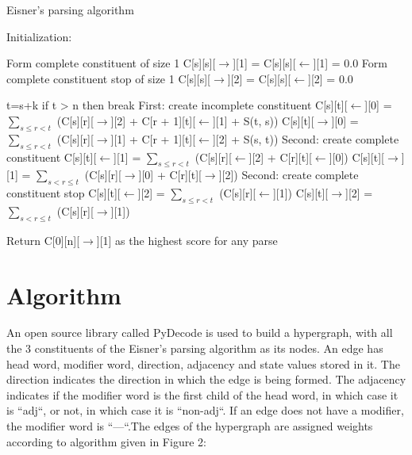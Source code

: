 \documentclass{article}
\begin{document}
\begin{algorithm}

\caption{Eisner's parsing algorithm}
  \label{Figure 1}

\begin{algorithmic}

  \State Initialization:

        Form complete constituent of size 1
        \State C[s][s][$\rightarrow$][1] = C[s][s][$\leftarrow$][1] = 0.0
        Form complete constituent stop of size 1
        \State C[s][s][$\rightarrow$][2] = C[s][s][$\leftarrow$][2] = 0.0
\EndFor




    \State t=s+k
     \State if t > n then break
     \State First: create incomplete constituent
      \State C[s][t][$\leftarrow$][0] = $\sum_{s \le r< t}$ (C[s][r][$\rightarrow$][2] + C[r + 1][t][$\leftarrow$][1] + S(t, s)) 
      \State C[s][t][$\rightarrow$][0] = $\sum_{s \le r<t}$ (C[s][r][$\rightarrow$][1] + C[r + 1][t][$\leftarrow$][2] + S(s, t)) 
      \State Second: create complete constituent
      \State C[s][t][$\leftarrow$][1] = $\sum_{s \le r<t}$ (C[s][r][$\leftarrow$][2] + C[r][t][$\leftarrow$][0])
      \State C[s][t][$\rightarrow$][1] = $\sum_{s<r \le t}$ (C[s][r][$\rightarrow$][0] + C[r][t][$\rightarrow$][2])
      \State Second: create complete constituent stop
      \State C[s][t][$\leftarrow$][2] = $\sum_{s \le r<t}$ (C[s][r][$\leftarrow$][1])
      \State C[s][t][$\rightarrow$][2] = $\sum_{s<r \le t}$ (C[s][r][$\rightarrow$][1])


\EndFor
\EndFor

      \State Return C[0][n][$\rightarrow$][1] as the highest score for any parse

\end{algorithmic}
\end{algorithm}



\section{Algorithm}


An open source library called PyDecode is used to build a hypergraph, with all the 3 constituents of the Eisner's parsing algorithm as its nodes. An edge has head word, modifier word, direction, adjacency and state values stored in it. The direction indicates the direction in which the edge is being formed. The adjacency indicates if the modifier word is the first child of the head word, in which case it is ``adj``, or not, in which case it is ``non-adj``. If an edge does not have a modifier, the modifier word is ``---``.The edges of the hypergraph are assigned weights according to algorithm given in Figure 2:
\end{document}
